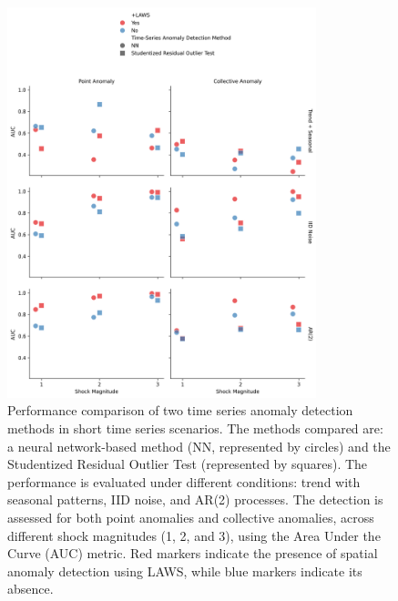 \documentclass[11pt]{article}
\begin{document}
\begin{figure}[h]
    \centering
    \includegraphics[width=0.8\textwidth]{../figure/simulation_short_time_series.png}
    \caption{Performance comparison of two time series anomaly detection methods in short time series scenarios. The methods compared are: a neural network-based method (NN, represented by circles) and the Studentized Residual Outlier Test (represented by squares). The performance is evaluated under different conditions: trend with seasonal patterns, IID noise, and AR(2) processes. The detection is assessed for both point anomalies and collective anomalies, across different shock magnitudes (1, 2, and 3), using the Area Under the Curve (AUC) metric. Red markers indicate the presence of spatial anomaly detection using LAWS, while blue markers indicate its absence.}
    \label{fig: simulation short time series}
\end{figure}
\end{document}
